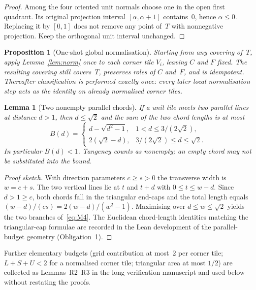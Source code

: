 \documentclass[11pt,reqno]{amsart}
\newtheorem{proposition}[theorem]{Proposition}
\newtheorem{lemma}[theorem]{Lemma}
\theoremstyle{definition}
\begin{document}
\begin{proof}
Among the four oriented unit normals choose one in the open first quadrant.
Its original projection interval $[\alpha,\alpha+1]$ contains~$0$, hence
$\alpha\le 0$.  Replacing it by $[0,1]$ does not remove any point of~$T$ with
nonnegative projection.  Keep the orthogonal unit interval unchanged.
\end{proof}

\begin{proposition}[One-shot global normalisation]\label{prop:M1}
Starting from any covering of~$T$, apply Lemma~\ref{lem:norm} once to each
corner tile $V_i$, leaving $C$ and $F$ fixed.  The resulting covering still
covers~$T$, preserves roles of $C$ and~$F$, and is idempotent.  Thereafter
classification is performed exactly once: every later local normalisation step
acts as the identity on already normalised corner tiles.
\end{proposition}

\begin{lemma}[Two nonempty parallel chords]\label{lem:B}
If a unit tile meets two parallel lines at distance $d>1$, then $d\le\sqrt2$
and the sum of the two chord lengths is at most
\begin{equation}\label{eq:M4}
B(d)=\begin{cases}
d-\sqrt{d^2-1},& 1<d\le 3/(2\sqrt2),\\
2(\sqrt2-d),& 3/(2\sqrt2)\le d\le\sqrt2.
\end{cases}
\end{equation}
In particular $B(d)<1$.  Tangency counts as nonempty; an empty chord may not
be substituted into the bound.
\end{lemma}

\begin{proof}[Proof sketch]
With direction parameters $c\ge s>0$ the transverse width is $w=c+s$.  The two
vertical lines lie at $t$ and $t+d$ with $0\le t\le w-d$.  Since $d>1\ge c$,
both chords fall in the triangular end-caps and the total length equals
$(w-d)/(cs)=2(w-d)/(w^2-1)$.  Maximising over $d\le w\le\sqrt2$ yields the
two branches of~\eqref{eq:M4}.  The Euclidean chord-length identities matching
the triangular-cap formulae are recorded in the Lean development of the
parallel-budget geometry (Obligation~1).
\end{proof}

Further elementary budgets (grid contribution at most~$2$ per corner tile;
$L+S+U<2$ for a normalised corner tile; triangular area at most $1/2$) are
collected as Lemmas~R2--R3 in the long verification manuscript and used below
without restating the proofs.
\end{document}
